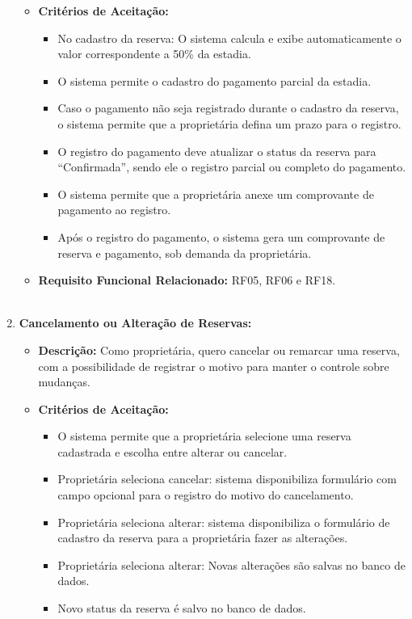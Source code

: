\documentclass[
	12pt,				%
	openany,			%
	oneside,			%
	a4paper,			%
	english,			%
	french,				%
	spanish,			%
	brazil				%
	]{abntex2}
\begin{document}
\begin{enumerate}[label=\textbf{\arabic*.}]
\begin{itemize}
		\item \textbf{Critérios de Aceitação:}
		\begin{itemize}
			\item No cadastro da reserva: O sistema calcula e exibe automaticamente o valor correspondente a 50\% da estadia.
			\item O sistema permite o cadastro do pagamento parcial da estadia.
			\item Caso o pagamento não seja registrado durante o cadastro da reserva, o sistema permite que a proprietária defina um prazo para o registro.
			\item O registro do pagamento deve atualizar o status da reserva para “Confirmada”, sendo ele o registro parcial ou completo do pagamento.
			\item O sistema permite que a proprietária anexe um comprovante de pagamento ao registro.
			\item Após o registro do pagamento, o sistema gera um comprovante de reserva e pagamento, sob demanda da proprietária.
		\end{itemize}
		\item \textbf{Requisito Funcional Relacionado:} RF05, RF06 e RF18.
		\\
		\\
	\end{itemize} 
	\item \textbf{Cancelamento ou Alteração de Reservas:}
	\begin{itemize}
		\item \textbf{Descrição:} Como proprietária, quero cancelar ou remarcar uma reserva, com a possibilidade de registrar o motivo  para manter o controle sobre mudanças.
		\item \textbf{Critérios de Aceitação:}
		\begin{itemize}
			\item O sistema permite que a proprietária selecione uma reserva cadastrada e escolha entre alterar ou cancelar.
			\item Proprietária seleciona cancelar: sistema disponibiliza formulário com campo opcional para o registro do motivo do cancelamento.
			\item Proprietária seleciona alterar: sistema disponibiliza o formulário de cadastro da reserva para a proprietária fazer as alterações.
			\item Proprietária seleciona alterar: Novas alterações são salvas no banco de dados.
			\item Novo status da reserva é salvo no banco de dados.

\end{itemize}
\end{itemize}
\end{enumerate}
\end{document}
